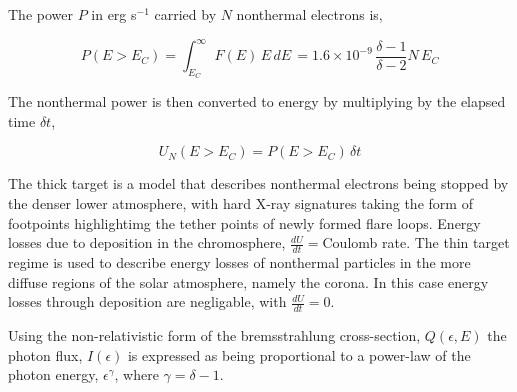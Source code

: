 The power $P$ in erg s$^{-1}$ carried by $N$ nonthermal electrons is,

\begin{equation}
P(E>E_C) = \int^{\infty}_{E_C} \, F(E) \, E \, dE \, = 1.6\times{10^{-9}} \, \frac{\delta - 1}{\delta - 2}N \, E_C
\end{equation}\label{totalelecpow}  


The nonthermal power is then converted to energy by multiplying by the elapsed time $\delta{t}$,

\begin{equation}
U_{N}(E > E_C) = P(E > E_C) \, \delta{t}
\end{equation}\label{totalelecenergy} 

The thick target is a model that describes nonthermal electrons being stopped by the denser lower atmosphere, with hard X-ray signatures taking the form of footpoints highlightimg the tether points of newly formed flare loops. Energy losses due to deposition in the chromosphere, $\frac{dU}{dt}=$Coulomb rate. The thin target regime is used to describe energy losses of nonthermal particles in the more diffuse regions of the solar atmosphere, namely the corona. In this case energy losses through deposition are negligable, with $\frac{dU}{dt}=0$.

Using the non-relativistic form of the bremsstrahlung cross-section, $Q(\epsilon,E)$ the photon flux, $I(\epsilon)$ is expressed as being proportional to a power-law of the photon energy, $\epsilon^{\gamma}$, where $\gamma = \delta -1$.



